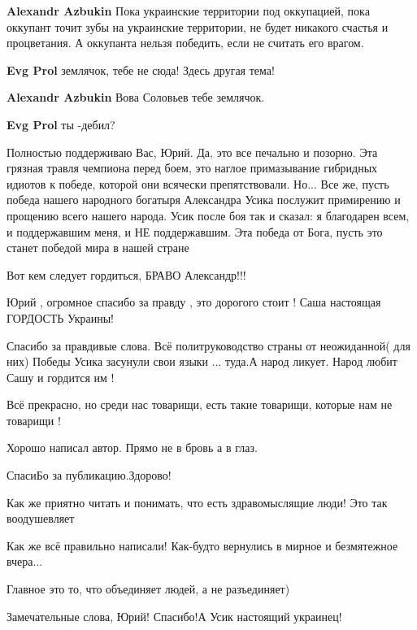 \begin{itemize}
\begin{itemize} %
\textbf{Alexandr Azbukin} Пока украинские территории под оккупацией, пока оккупант точит зубы на украинские территории, не будет никакого счастья и процветания. А оккупанта нельзя победить, если не считать его врагом.

\textbf{Evg Prol} землячок, тебе не сюда! Здесь другая тема!

\textbf{Alexandr Azbukin} Вова Соловьев тебе землячок.

\textbf{Evg Prol} ты -дебил?
\end{itemize} %


Полностью поддерживаю Вас, Юрий. Да, это все печально и позорно. Эта грязная
травля чемпиона перед боем, это наглое примазывание гибридных идиотов к победе,
которой они всячески препятствовали. Но... Все же, пусть победа нашего
народного богатыря Александра Усика послужит примирению и прощению всего нашего
народа. Усик после боя так и сказал: я благодарен всем, и поддержавшим меня, и
НЕ поддержавшим. Эта победа от Бога, пусть это станет победой мира в нашей
стране


Вот кем следует гордиться, БРАВО Александр!!!

Юрий , огромное спасибо за правду , это дорогого стоит ! Саша настоящая ГОРДОСТЬ Украины!


Спасибо за правдивые слова. Всё политруководство страны от неожиданной( для
них) Победы Усика засунули свои языки ... туда.А народ ликует. Народ любит Сашу
и гордится им !

Всё прекрасно, но среди нас товарищи, есть такие товарищи, которые нам не товарищи !

Хорошо написал автор. Прямо не в бровь а в глаз.

СпасиБо за публикацию.Здорово!

Как же приятно читать и понимать, что есть здравомыслящие люди!
Это так воодушевляет

Как же всё правильно написали! Как-будто вернулись в мирное и безмятежное вчера...

Главное это то, что объединяет людей, а не разъединяет)

Замечательные слова, Юрий! Спасибо!А Усик настоящий украинец!




\end{itemize} %
